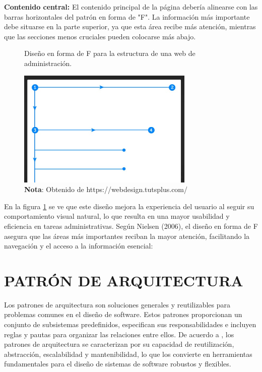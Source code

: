 		\textbf{Contenido central:} El contenido principal de la página debería alinearse con las barras horizontales del patrón en forma de "F". La información más importante debe situarse en la parte superior, ya que esta área recibe más atención, mientras que las secciones menos cruciales pueden colocarse más abajo.
		
		\begin{figure}[h] %
			\caption[Diseño en forma de F]
			{\newline Diseño en forma de F para la estructura de una web de administración.} %
			\vspace{0.3cm}
			\centering
			\includegraphics[width=0.75\textwidth]{imagenes/figura2_5.jpg} %
			\vspace{0.3cm}
			\caption*{\textup{\textbf{Nota}: Obtenido de https://webdesign.tutsplus.com/}}
			\vspace{-0.8cm}
			\label{fig:figura2_5} %
		\end{figure}
		
		En la figura \ref{fig:figura2_5} se ve que este diseño mejora la experiencia del usuario al seguir su comportamiento visual natural, lo que resulta en una mayor usabilidad y eficiencia en tareas administrativas. Según Nielsen (2006), el diseño en forma de F asegura que las áreas más importantes reciban la mayor atención, facilitando la navegación y el acceso a la información esencial:
	
	\section{PATRÓN DE ARQUITECTURA}
		Los patrones de arquitectura son soluciones generales y reutilizables para problemas comunes en el diseño de software. Estos patrones proporcionan un conjunto de subsistemas predefinidos, especifican sus responsabilidades e incluyen reglas y pautas para organizar las relaciones entre ellos. De acuerdo a \textcite{cervantes2016arquitectura}, los patrones de arquitectura se caracterizan por su capacidad de reutilización, abstracción, escalabilidad y mantenibilidad, lo que los convierte en herramientas fundamentales para el diseño de sistemas de software robustos y flexibles.
		
